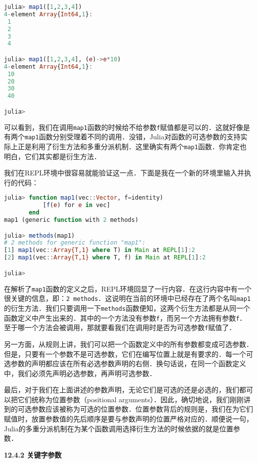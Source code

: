 \begin{lstlisting}[language=julia]
julia> map1([1,2,3,4])
4-element Array{Int64,1}:
 1
 2
 3
 4

julia> map1([1,2,3,4], (e)->e*10)
4-element Array{Int64,1}:
 10
 20
 30
 40

julia> 
\end{lstlisting}

可以看到，我们在调用\verb|map1|函数的时候给不给参数\verb|f|赋值都是可以的．这就好像是有两个\verb|map1|函数分别受理着不同的调用．没错，Julia对函数的可选参数的支持实际上正是利用了衍生方法和多重分派机制．这里确实有两个\verb|map1|函数．你肯定也明白，它们其实都是衍生方法．

我们在REPL环境中很容易就能验证这一点．下面是我在一个新的环境里输入并执行的代码：

\begin{lstlisting}[language=julia]
julia> function map1(vec::Vector, f=identity)
           [f(e) for e in vec]
       end
map1 (generic function with 2 methods)

julia> methods(map1)
# 2 methods for generic function "map1":
[1] map1(vec::Array{T,1} where T) in Main at REPL[1]:2
[2] map1(vec::Array{T,1} where T, f) in Main at REPL[1]:2

julia> 
\end{lstlisting}

在解析了\verb|map1|函数的定义之后，REPL环境回显了一行内容．在这行内容中有一个很关键的信息，即：\verb|2 methods|．这说明在当前的环境中已经存在了两个名叫\verb|map1|的衍生方法．我们只要调用一下\verb|methods|函数便知，这两个衍生方法都是从同一个函数定义中产生出来的．其中的一个方法没有参数\verb|f|，而另一个方法拥有参数\verb|f|．至于哪一个方法会被调用，那就要看我们在调用时是否为可选参数\verb|f|赋值了．

另一方面，从规则上讲，我们可以把一个函数定义中的所有参数都变成可选参数．但是，只要有一个参数不是可选参数，它们在编写位置上就是有要求的．每一个可选参数的声明都应该在所有必选参数声明的右侧．换句话说，在同一个函数定义中，我们必须先声明必选参数，再声明可选参数．

最后，对于我们在上面讲述的参数声明，无论它们是可选的还是必选的，我们都可以把它们统称为位置参数（positional arguments）．因此，确切地说，我们刚刚讲到的可选参数应该被称为可选的位置参数．位置参数背后的规则是，我们在为它们赋值时，放置参数值的先后顺序是要与参数声明的位置严格对应的．顺便说一句，Julia的多重分派机制在为某个函数调用选择衍生方法的时候依据的就是位置参数．

\textbf{12.4.2 关键字参数}

